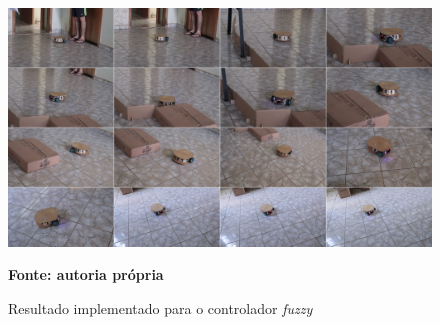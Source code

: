 \begin{figure}[ht]
\centering
\caption{Resultado implementado para o controlador \textit{fuzzy}}
\label{fig:resultadoImplementadoFuzzy}
		\centering
		\includegraphics[clip, 
scale=0.29]{Figuras/fuzzyCompactado}

	\textbf{Fonte: autoria própria}
\end{figure}